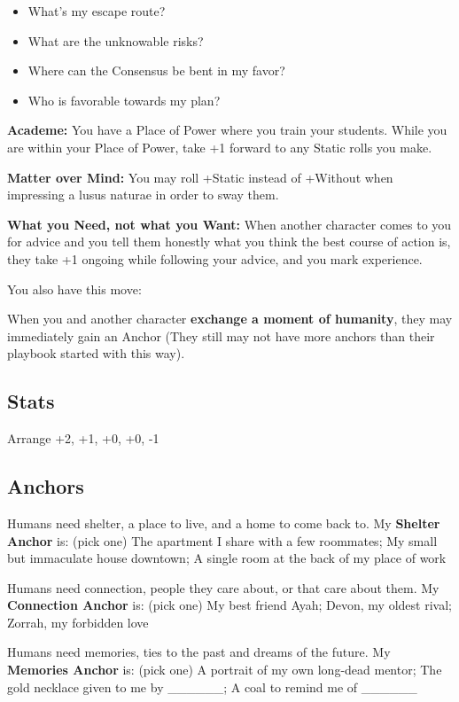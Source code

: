 \documentclass[
  oneside,
  statementpaper,
  9pt]{memoir}
\begin{document}
\begin{itemize}
\tightlist
\item
  What's my escape route?
\item
  What are the unknowable risks?
\item
  Where can the Consensus be bent in my favor?
\item
  Who is favorable towards my plan?
\end{itemize}

\textbf{Academe:} You have a Place of Power where you train your
students. While you are within your Place of Power, take +1 forward to
any Static rolls you make.

\textbf{Matter over Mind:} You may roll +Static instead of +Without when
impressing a lusus naturae in order to sway them.

\textbf{What you Need, not what you Want:} When another character comes
to you for advice and you tell them honestly what you think the best
course of action is, they take +1 ongoing while following your advice,
and you mark experience.

You also have this move:

When you and another character \textbf{exchange a moment of humanity},
they may immediately gain an Anchor (They still may not have more
anchors than their playbook started with this way).

\hypertarget{stats-5}{%
\subsection{Stats}\label{stats-5}}

Arrange +2, +1, +0, +0, -1

\hypertarget{anchors-5}{%
\subsection{Anchors}\label{anchors-5}}

Humans need shelter, a place to live, and a home to come back to. My
\textbf{Shelter Anchor} is: (pick one) The apartment I share with a few
roommates; My small but immaculate house downtown; A single room at the
back of my place of work

Humans need connection, people they care about, or that care about them.
My \textbf{Connection Anchor} is: (pick one) My best friend Ayah; Devon,
my oldest rival; Zorrah, my forbidden love

Humans need memories, ties to the past and dreams of the future. My
\textbf{Memories Anchor} is: (pick one) A portrait of my own long-dead
mentor; The gold necklace given to me by \_\_\_\_\_\_; A coal to remind
me of \_\_\_\_\_\_
\end{document}
